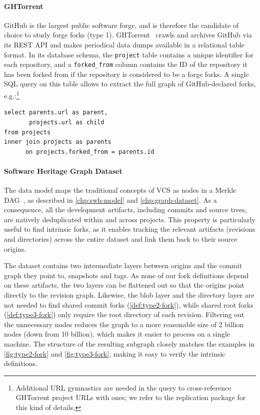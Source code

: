 \paragraph{GHTorrent}
GitHub is the largest public software forge, and is therefore the candidate of
choice to study forge forks (type 1). GHTorrent~\cite{GHTorrent} crawls and
archives GitHub via its REST API and makes periodical data dumps available in a
relational table format. In its database schema, the \texttt{project} table
contains a unique identifier for each repository, and a \texttt{forked\_from}
column contains the ID of the repository it has been forked from if the
repository is considered to be a forge forks.  A single SQL query on this table
allows to extract the full graph of GitHub-declared forks,
e.g.:\footnote{Additional URL gymnastics are needed in the query to
cross-reference GHTorrent project URLs with \SWH{} ones; we refer to the
replication package for this kind of details.}
\begin{verbatim}
select parents.url as parent,
       projects.url as child
from projects
inner join projects as parents
      on projects.forked_from = parents.id
\end{verbatim}

\paragraph{Software Heritage Graph Dataset}
The \SWHGD{} data model maps the traditional concepts of VCS as nodes in a Merkle
DAG~\cite{Merkle}, as described in \cref{chp:swh-model} and
\cref{chp:graph-dataset}. As a consequence, all the development artifacts,
including commits and source trees, are natively deduplicated within and across
projects. This property is particularly useful to find intrinsic forks, as it
enables tracking the relevant artifacts (revisions and directories) across the
entire dataset and link them back to their source origins.

The dataset contains two intermediate layers between origins and the
commit graph they point to, snapshots and tags. As none of our fork definitions
depend on these artifacts, the two layers can be flattened out so that the
origins point directly to the revision graph.  Likewise, the blob layer and the
directory layer are not needed to find shared commit forks
(\cref{def:type2-fork}), while shared root forks
(\cref{def:type3-fork}) only require the root directory of each
revision.  Filtering out the unnecessary nodes reduces the graph to a more
reasonable size of 2 billion nodes (down from 10 billion), which makes it
easier to process on a single machine. The structure of the resulting subgraph
closely matches the examples in \cref{fig:type2-fork} and
\cref{fig:type3-fork}, making it easy to verify the intrinsic definitions.

